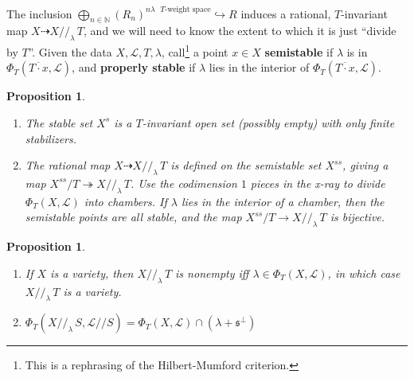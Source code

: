 \documentclass[11pt]{amsart}
\newtheorem{proposition}[Thm]{Proposition}
\theoremstyle{definition}
\newcommand{\NN}{\mathbb{N}}
\newcommand\defn[1]{{\bf #1}}
\newcommand\Oplus\bigoplus
\newcommand\lie[1]{{\mathfrak #1}}
\newcommand\calL{{\mathcal L}}
\newcommand\into\hookrightarrow
\newcommand\onto\twoheadrightarrow
\begin{document}
The inclusion $ \Oplus_{n\in\NN} (R_n)^{\text{$n\lambda$ $T$-weight space}}
\into R$ induces a rational, $T$-invariant map
$X \dasharrow X//_\lambda\, T$, and we will need to know the extent to
which it is just ``divide by $T$''. Given the data $X,\calL,T,\lambda$,
call\footnote{This is a rephrasing of the Hilbert-Mumford criterion.}
a point $x\in X$ \defn{semistable} if $\lambda$ is in
$\Phi_T\left(\overline{T\cdot x},\calL\right)$,
and \defn{properly stable} if $\lambda$ lies in the interior of
$\Phi_T\left(\overline{T\cdot x},\calL\right)$.

\begin{proposition}\cite{brion1990action}\label{prop:brionprocesi}
  \begin{enumerate}
  \item The stable set $X^s$ is a $T$-invariant open set (possibly empty)
    with only finite stabilizers.
  \item The rational map $X \dasharrow X//_\lambda\, T$ is defined on
    the semistable set $X^{ss}$, giving a map $X^{ss}/T \onto X//_\lambda\, T$.
    Use the codimension $1$ pieces in the x-ray to divide
    $\Phi_T(X,\calL)$ into chambers. If $\lambda$ lies in the interior
    of a chamber, then the semistable points are all stable, 
    and the map $X^{ss}/T \to X//_\lambda\, T$ is bijective.
  \end{enumerate}
\end{proposition}

\begin{proposition}\label{prop:slicing}
  \begin{enumerate}
  \item If $X$ is a variety, then $X//_\lambda\, T$ is nonempty iff
    $\lambda \in \Phi_T(X,\calL)$, in which case $X//_\lambda\, T$ is a variety.
  \item $\Phi_T(X//_\lambda\, S, \calL//S)
    = \Phi_T(X,\calL) \cap (\lambda + \lie s^\perp)$
  \end{enumerate}
\end{proposition}
\end{document}
